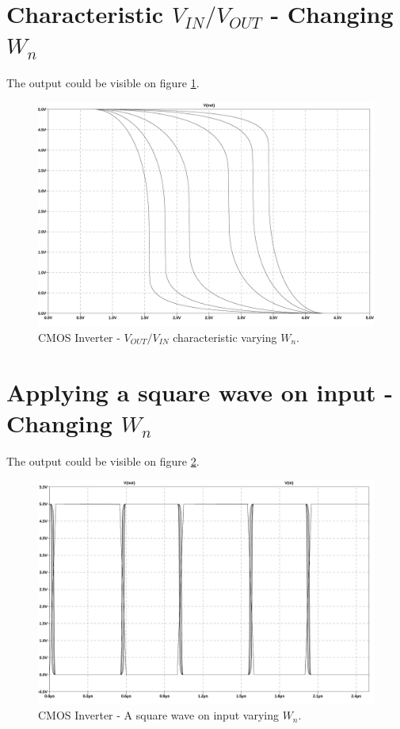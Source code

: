 \section{Characteristic $V_{IN}/V_{OUT}$ - Changing $W_n$}

The output could be visible on figure \ref{characteristicCWn}.
\begin{figure}[H]
  \centering
  \includegraphics[width=14cm]{graph/CMOSInverter/CharacteristicCWn.jpg}
  \caption{CMOS Inverter - $V_{OUT}/V_{IN}$ characteristic varying $W_n$.}
  \label{characteristicCWn}
\end{figure}

\section{Applying a square wave on input - Changing $W_n$}

The output could be visible on figure \ref{SquareWaveCWn}.
\begin{figure}[H]
  \centering
  \includegraphics[width=14cm]{graph/CMOSInverter/SquareWaveCWn.jpg}
  \caption{CMOS Inverter - A square wave on input varying $W_n$.}
  \label{SquareWaveCWn}
\end{figure}
